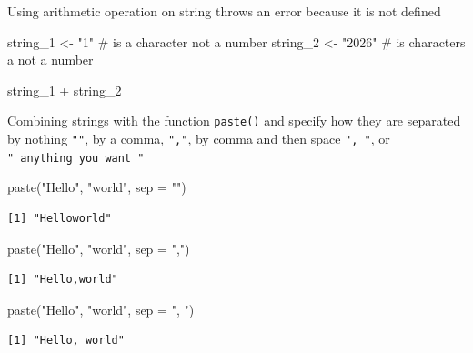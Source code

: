 \documentclass[
  letterpaper,
  DIV=11,
  numbers=noendperiod]{scrreprt}
\newenvironment{Shaded}{\begin{snugshade}}{\end{snugshade}}
\newcommand{\AttributeTok}[1]{\textcolor[rgb]{0.40,0.45,0.13}{#1}}
\newcommand{\CommentTok}[1]{\textcolor[rgb]{0.37,0.37,0.37}{#1}}
\newcommand{\FunctionTok}[1]{\textcolor[rgb]{0.28,0.35,0.67}{#1}}
\newcommand{\NormalTok}[1]{\textcolor[rgb]{0.00,0.23,0.31}{#1}}
\newcommand{\OtherTok}[1]{\textcolor[rgb]{0.00,0.23,0.31}{#1}}
\newcommand{\SpecialCharTok}[1]{\textcolor[rgb]{0.37,0.37,0.37}{#1}}
\newcommand{\StringTok}[1]{\textcolor[rgb]{0.13,0.47,0.30}{#1}}
\begin{document}
Using arithmetic operation on string throws an error because it is not
defined

\begin{Shaded}
\begin{Highlighting}[]
\NormalTok{string\_1 }\OtherTok{\textless{}{-}} \StringTok{"1"} \CommentTok{\# is a character not a number}
\NormalTok{string\_2 }\OtherTok{\textless{}{-}} \StringTok{"2026"} \CommentTok{\# is characters a not a number}

\NormalTok{string\_1 }\SpecialCharTok{+}\NormalTok{ string\_2}
\end{Highlighting}
\end{Shaded}

Combining strings with the function \texttt{paste()} and specify how
they are separated by nothing \texttt{""}, by a comma, \texttt{","}, by
comma and then space \texttt{",\ "}, or
\texttt{"\ anything\ you\ want\ "}

\begin{Shaded}
\begin{Highlighting}[]
\FunctionTok{paste}\NormalTok{(}\StringTok{"Hello"}\NormalTok{, }\StringTok{"world"}\NormalTok{, }\AttributeTok{sep =} \StringTok{""}\NormalTok{)}
\end{Highlighting}
\end{Shaded}

\begin{verbatim}
[1] "Helloworld"
\end{verbatim}

\begin{Shaded}
\begin{Highlighting}[]
\FunctionTok{paste}\NormalTok{(}\StringTok{"Hello"}\NormalTok{, }\StringTok{"world"}\NormalTok{, }\AttributeTok{sep =} \StringTok{","}\NormalTok{)}
\end{Highlighting}
\end{Shaded}

\begin{verbatim}
[1] "Hello,world"
\end{verbatim}

\begin{Shaded}
\begin{Highlighting}[]
\FunctionTok{paste}\NormalTok{(}\StringTok{"Hello"}\NormalTok{, }\StringTok{"world"}\NormalTok{, }\AttributeTok{sep =} \StringTok{", "}\NormalTok{)}
\end{Highlighting}
\end{Shaded}

\begin{verbatim}
[1] "Hello, world"
\end{verbatim}
\end{document}
